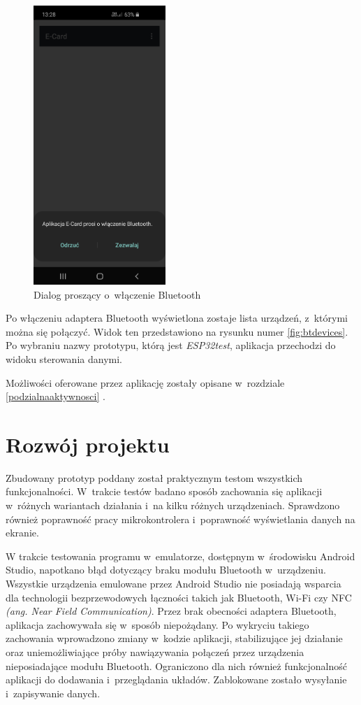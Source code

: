 \documentclass[a4paper,12pt, twoside]{article}
\begin{document}
    	\begin{figure}[H]
    	        \centering
    			\includegraphics[width=5cm]{images/rys_13bluetoothdialog.jpg}
    			\caption{Dialog proszący o~włączenie Bluetooth}
                \label{fig:bton}
    	\end{figure}
    	
    	Po włączeniu adaptera Bluetooth wyświetlona zostaje lista urządzeń, z~którymi można się połączyć. Widok ten przedstawiono na rysunku numer \ref{fig:btdevices}. Po wybraniu nazwy prototypu, którą jest \textit{ESP32test}, aplikacja przechodzi do widoku sterowania danymi.
    	
    	Możliwości oferowane przez aplikację zostały opisane w~rozdziale \ref{podzialnaaktywnosci} .
    	
    	\newpage
    	\section{Rozwój projektu}
    	Zbudowany prototyp poddany został praktycznym testom wszystkich funkcjonalności. W~trakcie testów badano sposób zachowania się aplikacji w~różnych wariantach działania i~na kilku różnych urządzeniach. Sprawdzono również poprawność pracy mikrokontrolera i~poprawność wyświetlania danych na ekranie.
    	
    	W trakcie testowania programu w~emulatorze, dostępnym w~środowisku Android Studio, napotkano błąd dotyczący braku modułu Bluetooth w~urządzeniu. Wszystkie urządzenia emulowane przez Android Studio nie posiadają wsparcia dla technologii bezprzewodowych łączności takich jak Bluetooth, Wi-Fi czy NFC \textit{(ang. Near Field Communication)}. Przez brak obecności adaptera Bluetooth, aplikacja zachowywała się w~sposób niepożądany. Po wykryciu takiego zachowania wprowadzono zmiany w~kodzie aplikacji, stabilizujące jej działanie oraz uniemożliwiające próby nawiązywania połączeń przez urządzenia nieposiadające modułu Bluetooth. Ograniczono dla nich również funkcjonalność aplikacji do dodawania i~przeglądania układów. Zablokowane zostało wysyłanie i~zapisywanie danych.
    	
\end{document}
